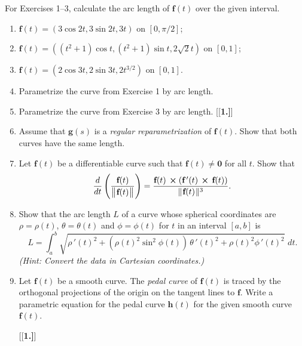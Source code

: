 \startexercises\label{sec1dot9}
\par\noindent For Exercises 1--3, calculate the arc length of $\textbf{f}(t)$ over the given interval.
\begin{enumerate}[\bfseries 1.]
 \item $\textbf{f}(t) = (3\cos 2t, 3\sin 2t, 3t)$ on $[0,\pi/2]$;
 \item $\textbf{f}(t) = ((t^2 + 1)\cos t, (t^2 + 1)\sin t, 2\sqrt{2} t)$ on $[0,1]$;
 \item $\textbf{f}(t) = (2\cos 3t, 2\sin 3t, 2t^{3/2})$ on $[0,1]$.
 \item Parametrize the curve from Exercise 1 by arc length.
 \item Parametrize the curve from Exercise 3 by arc length. 
[{[\bfseries 1.]}]
 \item Assume that $\textbf{g}(s)$ is a \emph{regular reparametrization} of $\textbf{f}(t)$. 
 Show that both curves have the same length.
 \item Let $\textbf{f}(t)$ be a differentiable curve such that $\textbf{f}(t) \ne \textbf{0}$ for all $t$. Show that
  \begin{displaymath}
   \frac{d}{dt} \left( \dfrac{\textbf{f}(t)}{\bigl\lVert\mspace{1mu}\textbf{f}(t)\mspace{1mu}\bigr\rVert} \right) =
    \dfrac{\textbf{f}(t)\, \bm{\times} (\textbf{f}\,'(t)\, \bm{\times} \,\textbf{f}(t))}{\lVert\mspace{1mu}\textbf{f}(t)\mspace{1mu}\rVert^3} .
  \end{displaymath}

 \item Show that the arc length $L$ of a curve whose spherical coordinates are $\rho = \rho(t)$, $\theta = \theta(t)$
  and $\phi = \phi(t)$ for $t$ in an interval $[a,b]$ is
  \begin{displaymath}
   L = \int_{a}^{b} \sqrt{\rho\,'(t)^2 + (\rho(t)^2 \sin^2 \phi(t))\,\theta\,'(t)^2 + \rho(t)^2 \phi\,'(t)^2}\,\, dt .
  \end{displaymath}
  \emph{(Hint: Convert the data in Cartesian coordinates.)}
  
  \item Let $\textbf{f}(t)$ be a smooth curve. 
  The \emph{pedal curve} of $\textbf{f}(t)$ is traced by the orthogonal projections of the origin on the tangent lines to $\textbf{f}$. Write a parametric equation for the pedal curve $\textbf{h}(t)$ for the given smooth curve $\textbf{f}(t)$.
  
[{[\bfseries 1.]}]
  

\end{enumerate}
